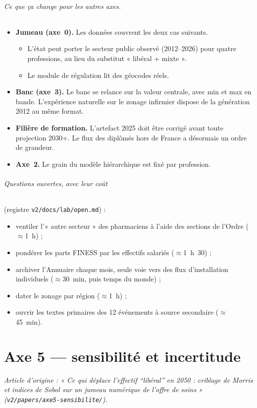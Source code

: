 \paragraph{Ce que ça change pour les autres axes.}
\begin{itemize}
  \item \textbf{Jumeau (axe~0).} Les données couvrent les deux cas suivants.
  \begin{itemize}
    \item L'état peut porter le secteur public observé (2012--2026) pour quatre professions, au lieu du
    substitut « libéral + mixte ».
    \item Le module de régulation lit des géocodes réels.
  \end{itemize}
  \item \textbf{Banc (axe~3).} Le banc se relance sur la valeur centrale, avec min et max en bande. L'expérience
  naturelle sur le zonage infirmier dispose de la génération 2012 au même format.
  \item \textbf{Filière de formation.} L'artefact 2025 doit être corrigé avant toute projection 2030+. Le flux
  des diplômés hors de France a désormais un ordre de grandeur.
  \item \textbf{Axe~2.} Le grain du modèle hiérarchique est fixé par profession.
\end{itemize}

\paragraph{Questions ouvertes, avec leur coût} (registre \texttt{v2/docs/lab/open.md}) :
\begin{itemize}
  \item ventiler l'« autre secteur » des pharmaciens à l'aide des sections de l'Ordre (\(\approx\)1~h) ;
  \item pondérer les parts FINESS par les effectifs salariés (\(\approx\)1~h~30) ;
  \item archiver l'Annuaire chaque mois, seule voie vers des flux d'installation individuels (\(\approx\)30~min,
  puis temps du monde) ;
  \item dater le zonage par région (\(\approx\)1~h) ;
  \item ouvrir les textes primaires des 12 événements à source secondaire (\(\approx\)45~min).
\end{itemize}



\part{Axe 5 --- sensibilité et incertitude}
\noindent\textit{Article d'origine : « Ce qui déplace l'effectif \enquote{libéral} en 2050 : criblage de Morris et indices de Sobol sur un jumeau numérique de l'offre de soins » (\texttt{v2/papers/axe5-sensibilite/}).}

